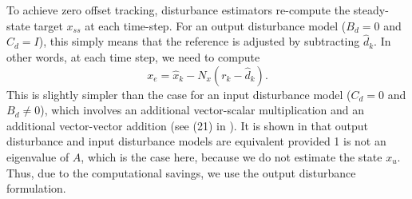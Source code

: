 \documentclass[journal,twocolumn,twoside]{IEEEtran}
\newcommand{\x}{\ensuremath{x }\xspace}
\begin{document}
To achieve zero offset tracking, disturbance estimators re-compute the steady-state target $\x_{ss}$ at each time-step. For an output disturbance model ($B_d=0$ and $C_d=I$), this simply means that the reference is adjusted by subtracting $\hat d_k$. In other words, at each time step, we need to compute
\begin{equation}
  x_{e} = \hat{x}_k - N_x(r_k - \hat{d}_k).
\end{equation}
This is slightly simpler than the case for an input disturbance model ($C_d=0$ and $B_d\neq0$), which involves an additional vector-scalar multiplication and an additional vector-vector addition (see (21) in \cite{maeder_offset-free_2007}). It is shown in \cite{maeder_offset-free_2007} that output disturbance and input disturbance models are equivalent provided 1 is not an eigenvalue of $A$, which is the case here, because we do not estimate the state $x_u$. Thus, due to the computational savings, we use the output disturbance formulation. 
\end{document}
